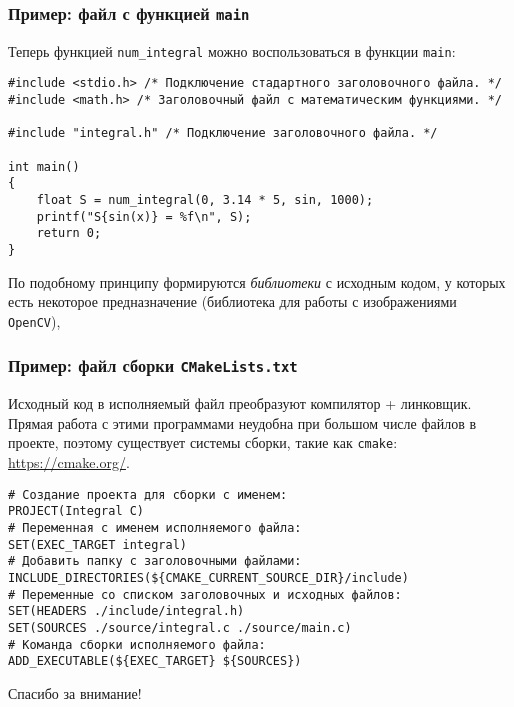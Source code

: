 \documentclass{beamer}
\begin{document}
    \begin{frame}[fragile]
        \frametitle{Пример: файл с функцией {\tt main}}
        Теперь функцией {\tt num\_integral} можно воспользоваться в функции {\tt main}:
        \begin{verbatim}
#include <stdio.h> /* Подключение стадартного заголовочного файла. */
#include <math.h> /* Заголовочный файл с математическим функциями. */

#include "integral.h" /* Подключение заголовочного файла. */

int main()
{
    float S = num_integral(0, 3.14 * 5, sin, 1000);
    printf("S{sin(x)} = %f\n", S);
    return 0;
}
        \end{verbatim}
        \par
        По подобному принципу формируются {\it библиотеки} с исходным кодом, у которых есть некоторое предназначение (библиотека для работы с изображениями {\tt OpenCV}),
    \end{frame}
    \begin{frame}[fragile]
        \frametitle{Пример: файл сборки {\tt CMakeLists.txt}}
        \justifying
        Исходный код в исполняемый файл преобразуют компилятор + линковщик. Прямая работа с этими программами неудобна при большом числе файлов в проекте, поэтому существует системы сборки, такие как {\tt cmakе}: \url{https://cmake.org/}.
        \begin{verbatim}
# Создание проекта для сборки с именем:
PROJECT(Integral C) 
# Переменная с именем исполняемого файла:
SET(EXEC_TARGET integral)
# Добавить папку с заголовочными файлами:
INCLUDE_DIRECTORIES(${CMAKE_CURRENT_SOURCE_DIR}/include)
# Переменные со списком заголовочных и исходных файлов:
SET(HEADERS ./include/integral.h)
SET(SOURCES ./source/integral.c ./source/main.c)
# Команда сборки исполняемого файла:
ADD_EXECUTABLE(${EXEC_TARGET} ${SOURCES})
        \end{verbatim}
    \end{frame}
    \begin{frame}
        \begin{center}
        \baselineskip 20.0mm
        \Huge Спасибо за внимание!
        \end{center}
    \end{frame}
\end{document}
